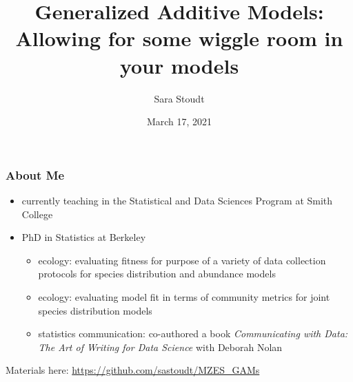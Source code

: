 \documentclass{beamer}
\title[GAMs]{Generalized Additive Models: \\ Allowing for some wiggle room in your models
} %
\author[@sastoudt]{Sara Stoudt
} %
\institute[Smith College] %
{
}
\date{March 17, 2021} %
\begin{document}
\begin{frame}
\titlepage %

\end{frame}


\begin{frame}
\frametitle{About Me}
\begin{itemize}
\item currently teaching in the Statistical and Data Sciences Program at Smith College
\item PhD in Statistics at Berkeley
\begin{itemize}
\item ecology: evaluating fitness for purpose of a variety of data collection protocols for species distribution and abundance models
\item ecology: evaluating model fit in terms of community metrics for joint species distribution models
\item statistics communication: co-authored a book \textit{Communicating with Data: The Art of Writing for Data Science} with Deborah Nolan
\end{itemize}
\end{itemize}

Materials here: \url{https://github.com/sastoudt/MZES_GAMs}

\end{frame}
\end{document}
